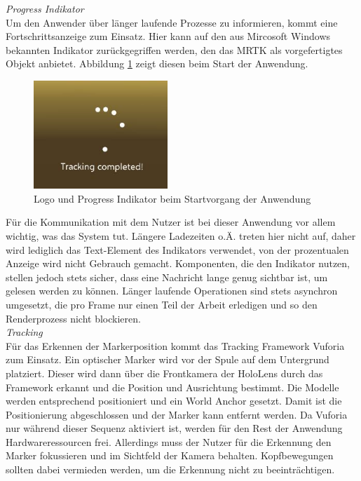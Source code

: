 \textit{Progress Indikator}\\
Um den Anwender über länger laufende Prozesse zu informieren, kommt eine Fortschrittsanzeige zum Einsatz. Hier kann auf den aus Mircosoft Windows bekannten Indikator zurückgegriffen werden, den das MRTK als vorgefertigtes Objekt anbietet. Abbildung \ref{img:pi-load} zeigt diesen beim Start der Anwendung.\\

\begin{figure}
	\centering
	\includegraphics[width=0.45\textwidth]{images/tracking.jpg}
	\caption{Logo und Progress Indikator beim Startvorgang der Anwendung}
	\label{img:pi-load}
\end{figure}

Für die Kommunikation mit dem Nutzer ist bei dieser Anwendung vor allem wichtig, was das System tut. Längere Ladezeiten o.Ä. treten hier nicht auf, daher wird lediglich das Text-Element des Indikators verwendet, von der prozentualen Anzeige wird nicht Gebrauch gemacht. Komponenten, die den Indikator nutzen, stellen jedoch stets sicher, dass eine Nachricht lange genug sichtbar ist, um gelesen werden zu können. Länger laufende Operationen sind stets asynchron umgesetzt, die pro Frame nur einen Teil der Arbeit erledigen und so den Renderprozess nicht blockieren.\\

\textit{Tracking}\\
Für das Erkennen der Markerposition kommt das Tracking Framework Vuforia zum Einsatz. Ein optischer Marker wird vor der Spule auf dem Untergrund platziert. Dieser wird dann über die Frontkamera der HoloLens durch das Framework erkannt und die Position und Ausrichtung bestimmt. Die Modelle werden entsprechend positioniert und ein World Anchor gesetzt. Damit ist die Positionierung abgeschlossen und der Marker kann entfernt werden. Da Vuforia nur während dieser Sequenz aktiviert ist, werden für den Rest der Anwendung Hardwareressourcen frei. Allerdings muss der Nutzer für die Erkennung den Marker fokussieren und im Sichtfeld der Kamera behalten. Kopfbewegungen sollten dabei vermieden werden, um die Erkennung nicht zu beeinträchtigen.\\

